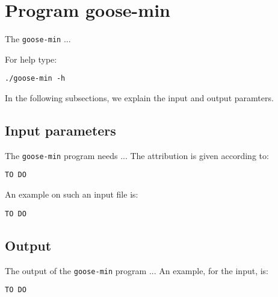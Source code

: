 \section{Program goose-min}
The \texttt{goose-min} ...

For help type:
\begin{lstlisting}
./goose-min -h
\end{lstlisting}
In the following subsections, we explain the input and output paramters.

\subsection{Input parameters}

The \texttt{goose-min} program needs ...
The attribution is given according to:
\begin{lstlisting}
TO DO
\end{lstlisting}

An example on such an input file is:
\begin{lstlisting}
TO DO
\end{lstlisting}

\subsection{Output}
The output of the \texttt{goose-min} program ...
An example, for the input, is:
\begin{lstlisting}
TO DO
\end{lstlisting}
